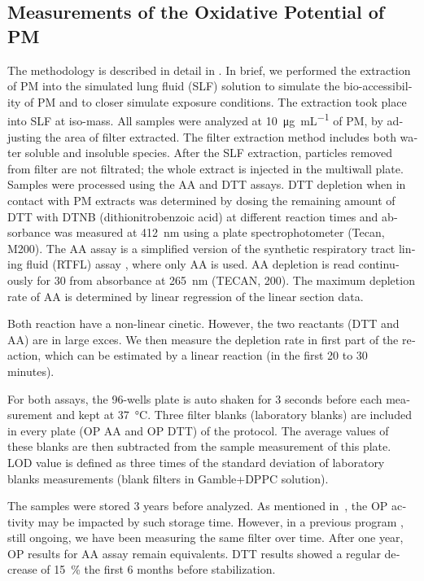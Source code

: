 \begin{otherlanguage}{english}
\subsection{Measurements of the Oxidative Potential of PM}
\label{measurements-of-the-oxidative-potential-of-pm}

The methodology is described in detail in \textcite{calasImportance2017}. In
brief, we performed the extraction of PM into the simulated lung fluid (SLF)
solution to simulate the bio-accessibility of PM and to closer simulate
exposure conditions. The extraction took place into SLF at iso-mass. All samples
were analyzed at \SI{10}{\micro\g\per\milli\liter} of PM, by adjusting the area of filter
extracted.
The filter extraction method includes both water soluble and insoluble species.
After the SLF extraction, particles removed from filter are not filtrated; the
whole extract is injected in the multiwall plate.  
Samples were processed using the AA and DTT assays. DTT depletion when in
contact with PM extracts was determined by dosing the remaining amount of DTT
with DTNB (dithionitrobenzoic acid) at different reaction times and absorbance
was measured at \SI{412}{\nano\meter} using a plate spectrophotometer (Tecan, M200). The
AA assay is a simplified version of the synthetic respiratory tract lining fluid
(RTFL) assay \parencite{kellyProtein2003}, where only AA is used. AA depletion is
read continuously for \SI{30}{\min} from absorbance at \SI{265}{\nano\meter} (TECAN,
200). 
The maximum depletion rate of AA is determined by linear regression of the
linear section data. 

Both reaction have a non-linear cinetic. However, the two reactants (DTT and AA)
are in large exces. We then measure the depletion rate in first part of the
reaction, which can be estimated by a linear reaction (in the first 20 to 30
minutes).

For both assays, the 96-wells plate is auto shaken for 3
seconds before each measurement and kept at \SI{37}{\degreeCelsius}.  Three filter
blanks (laboratory blanks) are included in every plate (OP AA and OP DTT) of the
protocol. The average values of these blanks are then subtracted from the sample
measurement of this plate. LOD value is defined as three times of the standard
deviation of laboratory blanks measurements (blank filters in Gamble+DPPC
solution).

The samples were stored 3 years before analyzed. As mentioned
in~\textcite{vermaOrganic2015}, the OP activity may be impacted by such storage
time. However, in a previous program \parencite{ansesexposureEtude2017}, still
ongoing, we have been measuring the same filter over time.  After one year, OP
results for AA assay remain equivalents. DTT results showed a regular decrease
of 15~\% the first 6 months before stabilization. 


\end{otherlanguage}
